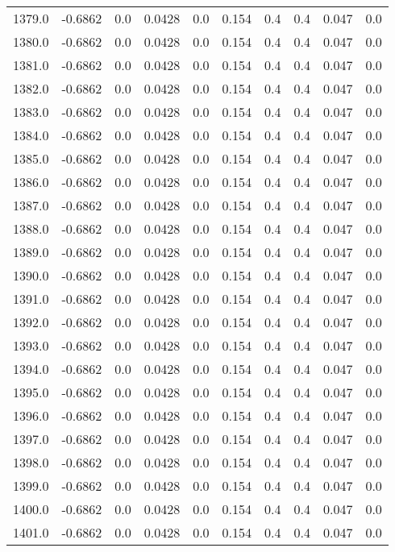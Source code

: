 \begin{longtable}{lrrrrrrrrr}
1379.0 & -0.6862 & 0.0 & 0.0428 & 0.0 & 0.154 & 0.4 & 0.4 & 0.047 & 0.0 \\
1380.0 & -0.6862 & 0.0 & 0.0428 & 0.0 & 0.154 & 0.4 & 0.4 & 0.047 & 0.0 \\
1381.0 & -0.6862 & 0.0 & 0.0428 & 0.0 & 0.154 & 0.4 & 0.4 & 0.047 & 0.0 \\
1382.0 & -0.6862 & 0.0 & 0.0428 & 0.0 & 0.154 & 0.4 & 0.4 & 0.047 & 0.0 \\
1383.0 & -0.6862 & 0.0 & 0.0428 & 0.0 & 0.154 & 0.4 & 0.4 & 0.047 & 0.0 \\
1384.0 & -0.6862 & 0.0 & 0.0428 & 0.0 & 0.154 & 0.4 & 0.4 & 0.047 & 0.0 \\
1385.0 & -0.6862 & 0.0 & 0.0428 & 0.0 & 0.154 & 0.4 & 0.4 & 0.047 & 0.0 \\
1386.0 & -0.6862 & 0.0 & 0.0428 & 0.0 & 0.154 & 0.4 & 0.4 & 0.047 & 0.0 \\
1387.0 & -0.6862 & 0.0 & 0.0428 & 0.0 & 0.154 & 0.4 & 0.4 & 0.047 & 0.0 \\
1388.0 & -0.6862 & 0.0 & 0.0428 & 0.0 & 0.154 & 0.4 & 0.4 & 0.047 & 0.0 \\
1389.0 & -0.6862 & 0.0 & 0.0428 & 0.0 & 0.154 & 0.4 & 0.4 & 0.047 & 0.0 \\
1390.0 & -0.6862 & 0.0 & 0.0428 & 0.0 & 0.154 & 0.4 & 0.4 & 0.047 & 0.0 \\
1391.0 & -0.6862 & 0.0 & 0.0428 & 0.0 & 0.154 & 0.4 & 0.4 & 0.047 & 0.0 \\
1392.0 & -0.6862 & 0.0 & 0.0428 & 0.0 & 0.154 & 0.4 & 0.4 & 0.047 & 0.0 \\
1393.0 & -0.6862 & 0.0 & 0.0428 & 0.0 & 0.154 & 0.4 & 0.4 & 0.047 & 0.0 \\
1394.0 & -0.6862 & 0.0 & 0.0428 & 0.0 & 0.154 & 0.4 & 0.4 & 0.047 & 0.0 \\
1395.0 & -0.6862 & 0.0 & 0.0428 & 0.0 & 0.154 & 0.4 & 0.4 & 0.047 & 0.0 \\
1396.0 & -0.6862 & 0.0 & 0.0428 & 0.0 & 0.154 & 0.4 & 0.4 & 0.047 & 0.0 \\
1397.0 & -0.6862 & 0.0 & 0.0428 & 0.0 & 0.154 & 0.4 & 0.4 & 0.047 & 0.0 \\
1398.0 & -0.6862 & 0.0 & 0.0428 & 0.0 & 0.154 & 0.4 & 0.4 & 0.047 & 0.0 \\
1399.0 & -0.6862 & 0.0 & 0.0428 & 0.0 & 0.154 & 0.4 & 0.4 & 0.047 & 0.0 \\
1400.0 & -0.6862 & 0.0 & 0.0428 & 0.0 & 0.154 & 0.4 & 0.4 & 0.047 & 0.0 \\
1401.0 & -0.6862 & 0.0 & 0.0428 & 0.0 & 0.154 & 0.4 & 0.4 & 0.047 & 0.0 \\

\end{longtable}
